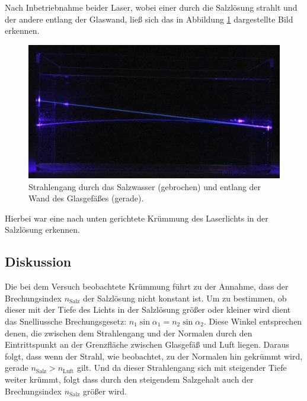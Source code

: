 		Nach Inbetriebnahme beider Laser, wobei einer durch die Salzlösung strahlt und der andere entlang der Glaswand, ließ sich das in Abbildung \ref{fig:Beobachtung1} dargestellte Bild erkennen.
		\begin{figure}[ht]
			\centering
			\includegraphics[width=\textwidth]{bilder/beobachtung1.jpg}
			\caption{Strahlengang durch das Salzwasser (gebrochen) und entlang der Wand des Glasgefäßes (gerade).\cite{WWU}}
			\label{fig:Beobachtung1}	
		\end{figure}
		Hierbei war eine nach unten gerichtete Krümmung des Laserlichts in der Salzlösung erkennen. 
		
	\subsection{Diskussion}
		
		Die bei dem Versuch beobachtete Krümmung führt zu der Annahme, dass der Brechungsindex  $n_\text{Salz}$ der Salzlösung nicht konstant ist.
		Um zu bestimmen, ob dieser mit der Tiefe des Lichts in der Salzlösung größer oder kleiner wird dient das Snelliussche Brechungsgesetz: $n_1\sin{\alpha_1} = n_2\sin{\alpha_2}$.
		Diese Winkel entsprechen denen, die zwischen dem Strahlengang und der Normalen durch den Eintrittspunkt an der Grenzfläche zwischen Glasgefäß und Luft liegen.
		Daraus folgt, dass wenn der Strahl, wie beobachtet, zu der Normalen hin gekrümmt wird, gerade $n_\text{Salz} > n_\text{Luft}$ gilt.
		Und da dieser Strahlengang sich mit steigender Tiefe weiter krümmt, folgt dass durch den steigendem Salzgehalt auch der Brechungsindex $n_\text{Salz}$ größer wird.
